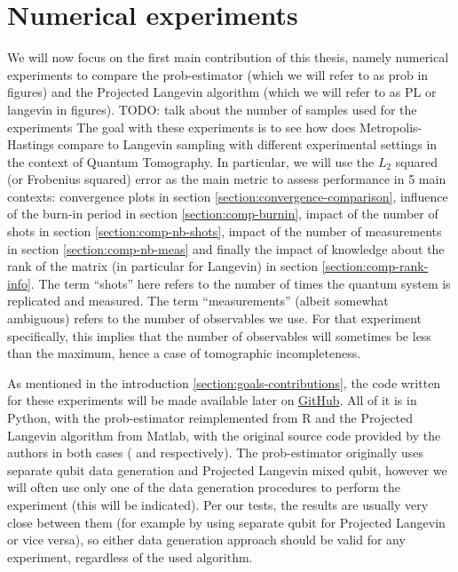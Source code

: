 \documentclass[12pt]{memoir}
\begin{document}
\chapter{Numerical experiments}\label{section:numerical-exp}
We will now focus on the first main contribution of this thesis, namely numerical experiments to compare the prob-estimator (which we will refer to as prob in figures) and the Projected Langevin algorithm (which we will refer to as PL or langevin in figures).\medbreak
TODO: talk about the number of samples used for the experiments
The goal with these experiments is to see how does Metropolis-Hastings compare to Langevin sampling with different experimental settings in the context of Quantum Tomography. In particular, we will use the $L_2$ squared (or Frobenius squared) error as the main metric to assess performance in 5 main contexts: convergence plots in section \ref{section:convergence-comparison}, influence of the burn-in period in section \ref{section:comp-burnin}, impact of the number of shots in section \ref{section:comp-nb-shots}, impact of the number of measurements in section \ref{section:comp-nb-meas} and finally the impact of knowledge about the rank of the matrix (in particular for Langevin) in section \ref{section:comp-rank-info}. The term ``shots'' here refers to the number of times the quantum system is replicated and measured. The term ``measurements'' (albeit somewhat ambiguous) refers to the number of observables we use. For that experiment specifically, this implies that the number of observables will sometimes be less than the maximum, hence a case of tomographic incompleteness. \medbreak

As mentioned in the introduction \ref{section:goals-contributions}, the code written for these experiments will be made available later on \href{https://github.com/daqwes/thesis}{GitHub}. All of it is in Python, with the prob-estimator reimplemented from R and the Projected Langevin algorithm from Matlab, with the original source code provided by the authors in both cases (\cite{MA17} and \cite{meth:bayesian:Langevin:ACMT2024} respectively). The prob-estimator originally uses separate qubit data generation and Projected Langevin mixed qubit, however we will often use only one of the data generation procedures to perform the experiment (this will be indicated). Per our tests, the results are usually very close between them (for example by using separate qubit for Projected Langevin or vice versa), so either data generation approach should be valid for any experiment, regardless of the used algorithm.\medbreak
\end{document}
